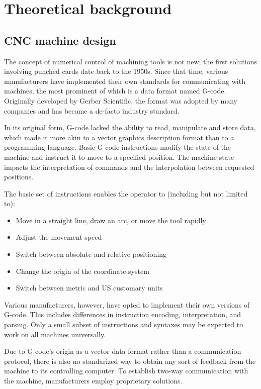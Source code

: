 \clearpage
\section{Theoretical background}

\subsection{CNC machine design}

The concept of numerical control of machining tools is not new; the first
solutions involving punched cards date back to the 1950s. Since that time,
various manufacturers have implemented their own standards for communicating
with machines, the most prominent of which is a data format named G-code.
Originally developed by Gerber Scientific, the format was adopted by many
companies and has become a de-facto industry standard.

In its original form, G-code lacked the ability to read, manipulate and store
data, which made it more akin to a vector graphics description format than to a
programming language. Basic G-code instructions modify the state of the machine
and instruct it to move to a specified position. The machine state impacts the
interpretation of commands and the interpolation between requested positions.

The basic set of instructions enables the operator to (including but not
limited to):
\begin{itemize}
    \item Move in a straight line, draw an arc, or move the tool rapidly
    \item Adjust the movement speed
    \item Switch between absolute and relative positioning
    \item Change the origin of the coordinate system
    \item Switch between metric and US customary units
\end{itemize}
Various manufacturers, however, have opted to implement their own versions of
G-code. This includes differences in instruction encoding, interpretation, and
parsing. Only a small subset of instructions and syntaxes may be expected to
work on all machines universally.

Due to G-code's origin as a vector data format rather than a communication
protocol, there is also no standarized way to obtain any sort of feedback from
the machine to its controlling computer. To establish two-way communication
with the machine, manufacturers employ proprietary solutions.

